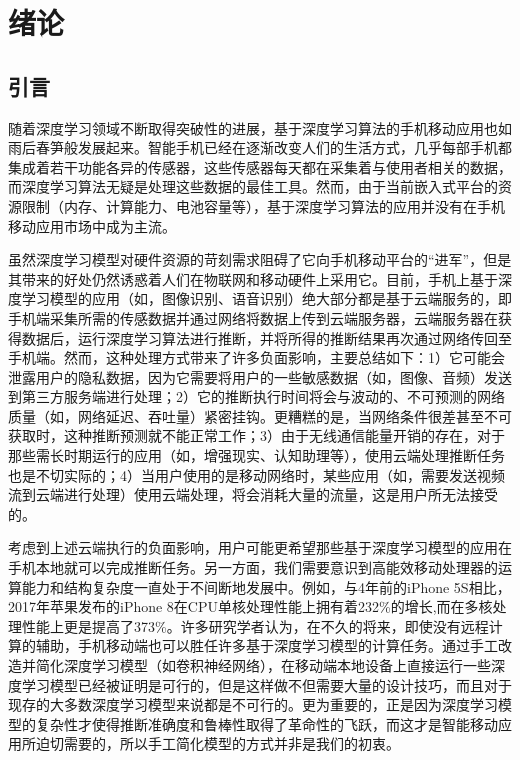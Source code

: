 \chapter{绪论}

\section{引言}
随着深度学习领域不断取得突破性的进展，基于深度学习算法的手机移动应用也如雨后春笋般发展起来。智能手机已经在逐渐改变人们的生活方式，几乎每部手机都集成着若干功能各异的传感器，这些传感器每天都在采集着与使用者相关的数据，而深度学习算法无疑是处理这些数据的最佳工具。然而，由于当前嵌入式平台的资源限制（内存、计算能力、电池容量等），基于深度学习算法的应用并没有在手机移动应用市场中成为主流。

虽然深度学习模型对硬件资源的苛刻需求阻碍了它向手机移动平台的“进军”，但是其带来的好处仍然诱惑着人们在物联网和移动硬件上采用它。目前，手机上基于深度学习模型的应用（如，图像识别、语音识别）绝大部分都是基于云端服务的，即手机端采集所需的传感数据并通过网络将数据上传到云端服务器，云端服务器在获得数据后，运行深度学习算法进行推断，并将所得的推断结果再次通过网络传回至手机端。然而，这种处理方式带来了许多负面影响，主要总结如下：1）它可能会泄露用户的隐私数据，因为它需要将用户的一些敏感数据（如，图像、音频）发送到第三方服务端进行处理；2）它的推断执行时间将会与波动的、不可预测的网络质量（如，网络延迟、吞吐量）紧密挂钩。更糟糕的是，当网络条件很差甚至不可获取时，这种推断预测就不能正常工作；3）由于无线通信能量开销的存在，对于那些需长时期运行的应用（如，增强现实、认知助理等），使用云端处理推断任务也是不切实际的；4）当用户使用的是移动网络时，某些应用（如，需要发送视频流到云端进行处理）使用云端处理，将会消耗大量的流量，这是用户所无法接受的。

考虑到上述云端执行的负面影响，用户可能更希望那些基于深度学习模型的应用在手机本地就可以完成推断任务。另一方面，我们需要意识到高能效移动处理器的运算能力和结构复杂度一直处于不间断地发展中。例如，与4年前的iPhone 5S相比，2017年苹果发布的iPhone 8在CPU单核处理性能上拥有着232\%的增长,而在多核处理性能上更是提高了373\%。许多研究学者认为，在不久的将来，即使没有远程计算的辅助，手机移动端也可以胜任许多基于深度学习模型的计算任务。通过手工改造并简化深度学习模型（如卷积神经网络），在移动端本地设备上直接运行一些深度学习模型已经被证明是可行的，但是这样做不但需要大量的设计技巧，而且对于现存的大多数深度学习模型来说都是不可行的。更为重要的，正是因为深度学习模型的复杂性才使得推断准确度和鲁棒性取得了革命性的飞跃，而这才是智能移动应用所迫切需要的，所以手工简化模型的方式并非是我们的初衷。

